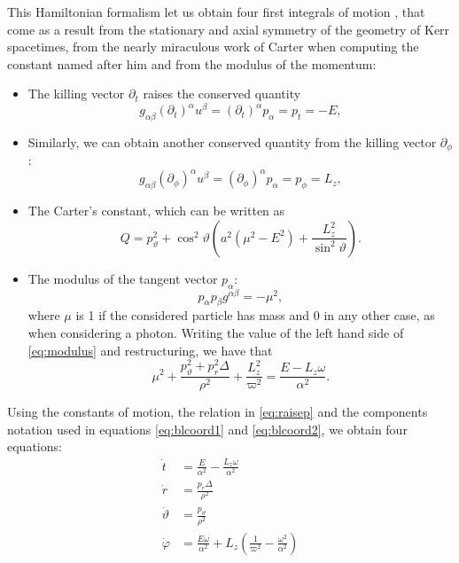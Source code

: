 This Hamiltonian formalism let us obtain four first integrals of motion \cite[pp. 898-899]{thorne73}, that come as a result from the stationary and axial symmetry of the geometry of Kerr spacetimes, from the nearly miraculous work of Carter when computing the constant named after him \cite{carter68} and from the modulus of the momentum:
\begin{itemize}
	\item The killing vector $\partial_t$ raises the conserved quantity
	\[
		g_{\alpha\beta}(\partial_t)^\alpha u^\beta = (\partial_t)^\alpha p_\alpha = p_t = -E,
	\]
	\item Similarly, we can obtain another conserved quantity from the killing vector $\partial_\phi$:
	\[
		g_{\alpha\beta}(\partial_\phi)^\alpha u^\beta = (\partial_\phi)^\alpha p_\alpha = p_\phi = L_z,
	\]
	\item The Carter's constant, which can be written as
	\begin{equation}
		\label{eq:carter}
		Q = p_\vartheta^2 + \cos^2\vartheta \left( a^2 \left( \mu^2 - E^2 \right) + \frac{L_z^2}{\sin^2\vartheta} \right).
	\end{equation}
	\item The modulus of the tangent vector $p_\alpha$:
	\begin{equation}
		\label{eq:modulus}
		p_\alpha p_\beta g^{\alpha\beta} = -\mu^2,
	\end{equation}
	where $\mu$ is 1 if the considered particle has mass and 0 in any other case, as when considering a photon. Writing the value of the left hand side of \autoref{eq:modulus} and restructuring, we have that
	\[
		\mu^2 + \frac{p_\vartheta^2 + p_r^2 \Delta}{\rho^2} + \frac{L_z^2}{\varpi^2} = \frac{E - L_z \omega}{\alpha^2}.
	\]
\end{itemize}



Using the constants of motion, the relation in \autoref{eq:raisep} and the components notation used in equations \ref{eq:blcoord1} and  \ref{eq:blcoord2}, we obtain four equations:
\begin{align}
	\label{eq:initt}
	\dot{t} &= \frac{E}{\alpha^2} - \frac{L_z \omega}{\alpha^2} \\
	\label{eq:initr}
	\dot{r} &= \frac{p_r \Delta}{\rho^2} \\
	\label{eq:inittheta}
	\dot{\vartheta} &= \frac{p_\vartheta}{\rho^2} \\
	\label{eq:initphi}
	\dot{\varphi} &= \frac{E \omega}{\alpha^2} + L_z\left( \frac{1}{\varpi^2} - \frac{\omega^2}{\alpha^2} \right)
\end{align}


